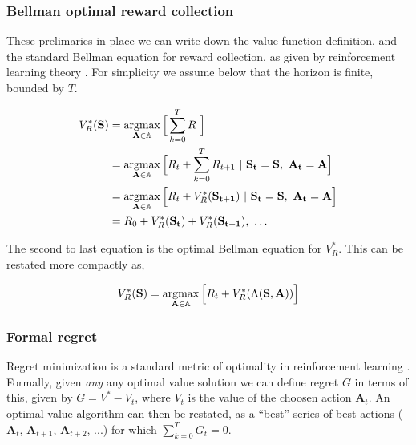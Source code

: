 \subsubsection*{Bellman optimal reward collection}
These prelimaries in place we can write down the value function definition, and the standard Bellman equation \cite{Bellmann1954} for reward collection, as given by reinforcement learning theory \citep{Sutton2018}. For simplicity we assume below that the horizon is finite, bounded by $T$.

\begin{equation} 
	\label{eq:bellman_seq}
    \begin{split}
        V^*_{R}(\mathbf{S}) &= \argmax_{\mathbf{A} \in \mathbb{A}} \Big [\sum_{k=0}^{T}  R \ \Big ]\\
                         	&= \argmax_{\mathbf{A} \in \mathbb{A}} \Big [ R_{t} + \sum_{k=0}^{T} R_{t+1} \ | \ \mathbf{S_t} = \mathbf{S},\ \mathbf{A_t} = \mathbf{A} \Big ]\\
							&= \argmax_{\mathbf{A} \in \mathbb{A}} \Big [ R_{t} + V^*_{R}(\mathbf{S_{t+1}}) \ | \ \mathbf{S_t} = \mathbf{S},\ \mathbf{A_t} = \mathbf{A} \Big ]\\
                         	&= R_0 + V^*_{R}(\mathbf{S_{t}}) + V^*_{R}(\mathbf{S_{t+1}}),\ \ldots
    \end{split}
\end{equation}

The second to last equation is the optimal Bellman equation for $V^*_R$. This can be restated more compactly as,

\begin{equation} 
\label{eq:bellman_iter}
V^*_R(\mathbf{S}) = \operatorname*{argmax}_{\mathbf{A} \in \mathbb{A}} \Big [ R_{t}  + V^*_{R}(\Lambda(\mathbf{S},\mathbf{A})) \Big ]
\end{equation}

\subsubsection*{Formal regret}
Regret minimization is a standard metric of optimality in reinforcement learning \citep{Sutton2018}. Formally, given \emph{any} any optimal value solution we can define regret $G$ in terms of this, given by $G = V^* - V_t$, where $V_t$ is the value of the choosen action $\mathbf{A}_t$. An optimal value algorithm can then be restated, as a ``best'' series of best actions ($\mathbf{A}_t$, $\mathbf{A}_{t+1}$, $\mathbf{A}_{t+2}$, ...) for which $\sum_{k=0}^{T} G_t = 0$.

